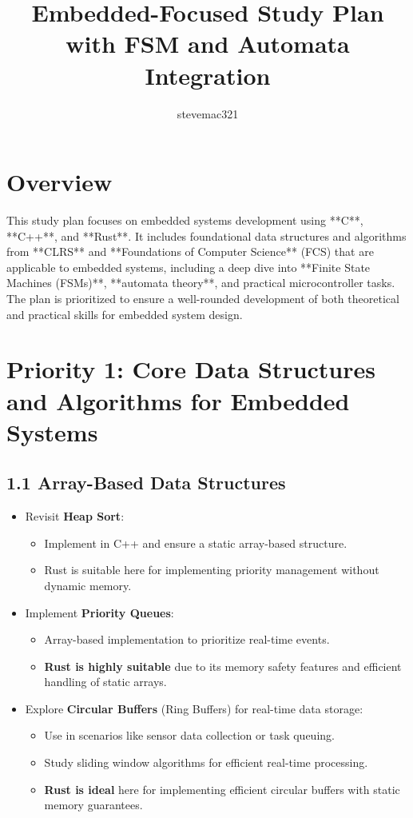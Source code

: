 \documentclass{article}
\title{Embedded-Focused Study Plan with FSM and Automata Integration}
\author{stevemac321}
\date{}
\begin{document}
\maketitle

\section*{Overview}
This study plan focuses on embedded systems development using **C**, **C++**, and **Rust**. It includes foundational data structures and algorithms from **CLRS** and **Foundations of Computer Science** (FCS) that are applicable to embedded systems, including a deep dive into **Finite State Machines (FSMs)**, **automata theory**, and practical microcontroller tasks. The plan is prioritized to ensure a well-rounded development of both theoretical and practical skills for embedded system design.

\section*{Priority 1: Core Data Structures and Algorithms for Embedded Systems}
\subsection*{1.1 Array-Based Data Structures}
\begin{itemize}
    \item Revisit \textbf{Heap Sort}:
    \begin{itemize}
        \item Implement in C++ and ensure a static array-based structure.
        \item Rust is suitable here for implementing priority management without dynamic memory.
    \end{itemize}
    \item Implement \textbf{Priority Queues}:
    \begin{itemize}
        \item Array-based implementation to prioritize real-time events.
        \item \textbf{Rust is highly suitable} due to its memory safety features and efficient handling of static arrays.
    \end{itemize}
    \item Explore \textbf{Circular Buffers} (Ring Buffers) for real-time data storage:
    \begin{itemize}
        \item Use in scenarios like sensor data collection or task queuing.
        \item Study sliding window algorithms for efficient real-time processing.
        \item \textbf{Rust is ideal} here for implementing efficient circular buffers with static memory guarantees.
    \end{itemize}
\end{itemize}
\end{document}
